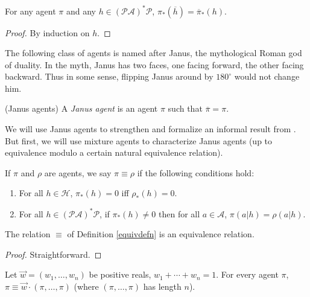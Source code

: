 \documentclass[runningheads]{llncs}
\begin{document}
\begin{lemma}
\label{asteriskcommuteswithoverlinelemma}
    For any agent $\pi$ and any $h\in(\mathcal P\mathcal A)^*\mathcal P$,
    $\pi_*(\overline h)=\overline{\pi}_*(h)$.
\end{lemma}

\begin{proof}
    By induction on $h$.
\end{proof}

The following class of agents is named after Janus, the mythological
Roman god of duality. In the myth, Janus has two faces, one facing
forward, the other facing backward. Thus in some sense, flipping Janus
around by $180^\circ$ would not change him.

\begin{definition}
    (Janus agents)
    A \emph{Janus agent} is an agent $\pi$ such that
    $\overline{\pi}=\pi$.
\end{definition}

We will use Janus agents to strengthen and formalize an informal result
from \cite{alexander2021reward}.
But first, we will use mixture agents to characterize
Janus agents (up to equivalence modulo a certain natural equivalence relation).

\begin{definition}
\label{equivdefn}
    If $\pi$ and $\rho$ are agents, we say $\pi\equiv\rho$ if the
    following conditions hold:
    \begin{enumerate}
        \item For all $h\in\mathcal H$, $\pi_*(h)=0$ iff $\rho_*(h)=0$.
        \item For all $h\in(\mathcal P\mathcal A)^*\mathcal P$,
            if $\pi_*(h)\not=0$ then for all $a\in\mathcal A$,
            $\pi(a|h)=\rho(a|h)$.
    \end{enumerate}
\end{definition}

\begin{lemma}
\label{equivrelationlemma}
    The relation $\equiv$ of Definition \ref{equivdefn} is an equivalence
    relation.
\end{lemma}

\begin{proof}
    Straightforward.
\end{proof}

\begin{lemma}
\label{piopluspilemma}
    Let $\vec w=(w_1,\ldots,w_n)$ be positive reals,
    $w_1+\cdots+w_n=1$. For every agent $\pi$,
    $\pi\equiv\vec w\cdot (\pi,\ldots,\pi)$ (where
    $(\pi,\ldots,\pi)$ has length $n$).
\end{lemma}
\end{document}
